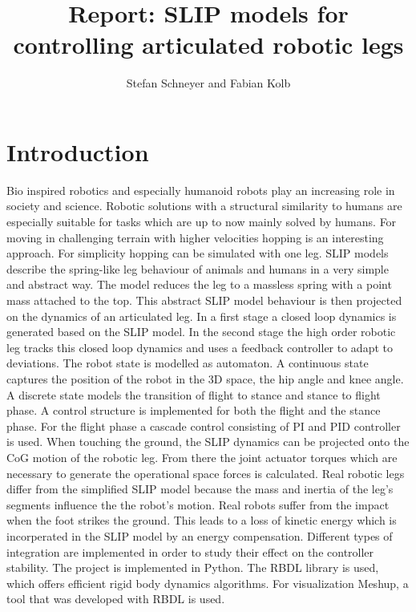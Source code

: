\documentclass[10pt, conference]{IEEEtran}
\title{\LARGE \bf
Report: SLIP models for controlling articulated robotic legs
}
\author{Stefan Schneyer and Fabian Kolb}
\begin{document}
\maketitle
\thispagestyle{empty}
\pagestyle{empty}



\section{Introduction}
\label{sec:Introduction}


Bio inspired robotics and especially humanoid robots play an increasing role in society and science. Robotic solutions with a structural 
similarity to humans are especially suitable for tasks which are up to now mainly solved by humans. For moving in challenging terrain with higher velocities
hopping is an interesting approach. For simplicity hopping can be simulated with one leg. SLIP models describe the spring-like leg behaviour
of animals and humans in a very simple and abstract way. The model reduces the leg to a massless spring with a point mass attached to the top. 
This abstract SLIP model behaviour is then projected on the dynamics of an articulated leg. 
In a first stage a closed loop dynamics is generated based on the SLIP model. In the second stage the high order robotic leg tracks this closed loop dynamics 
and uses a feedback controller to adapt to deviations. The robot state is modelled as automaton. A continuous state captures the position of the 
robot in the 3D space, the hip angle and knee angle. A discrete state models the transition of flight to stance and stance to flight phase. 
A control structure is implemented for both the flight and the stance phase. 
For the flight phase a cascade control consisting of PI and PID controller is used. When touching the ground, the SLIP dynamics can be 
projected onto the CoG motion of the robotic leg. From there the joint actuator torques which are necessary to generate the operational space 
forces is calculated. Real robotic legs differ from the simplified SLIP model because the mass and inertia of the leg's segments influence the 
the robot's motion. Real robots suffer from the impact when the foot strikes the ground. This leads to a loss of kinetic energy which is incorperated in 
the SLIP model by an energy compensation. Different types of integration are implemented in order to study their effect on the controller stability. 
The project is implemented in Python. The RBDL library is used, which offers efficient rigid body dynamics algorithms. 
For visualization Meshup, a tool that was developed with RBDL is used.
\end{document}
